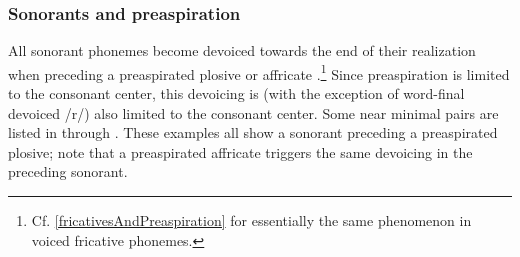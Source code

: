 \subsubsection{Sonorants and preaspiration}\label{sonorantsAndPreaspiration}
All sonorant phonemes become devoiced towards the end of their realization when preceding a preaspirated plosive or affricate%
.\footnote{Cf. \SEC\ref{fricativesAndPreaspiration} for essentially the same phenomenon in voiced fricative phonemes.} 
Since preaspiration is limited to the consonant center, this devoicing is (with the exception of word-final devoiced /r/) also limited to the consonant center. Some near minimal pairs are listed in  through . 
These examples all show a sonorant preceding a preaspirated plosive; note that a preaspirated affricate triggers the same devoicing in the preceding sonorant. 



